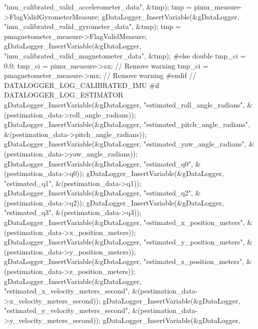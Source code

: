 \begin{DoxyCode}
{       "imu\_calibrated\_valid\_accelerometer\_data", &tmp);}
\textcolor{comment}{    tmp = pimu\_measure->FlagValidGyrometerMeasure;}
\textcolor{comment}{    gDataLogger\_InsertVariable(&gDataLogger,
       "imu\_calibrated\_valid\_gyrometer\_data", &tmp);}
\textcolor{comment}{    tmp = pmagnetometer\_measure->FlagValidMeasure;}
\textcolor{comment}{    gDataLogger\_InsertVariable(&gDataLogger,
       "imu\_calibrated\_valid\_magnetometer\_data", &tmp);}
\textcolor{comment}{    #else}
\textcolor{comment}{    double tmp\_ci = 0.0;}
\textcolor{comment}{    tmp\_ci = pimu\_measure->ax; // Remove warning}
\textcolor{comment}{    tmp\_ci = pmagnetometer\_measure->mx; // Remove warning}
\textcolor{comment}{    #endif // DATALOGGER\_LOG\_CALIBRATED\_IMU}
\textcolor{comment}{}
\textcolor{comment}{ }
\textcolor{comment}{    #if DATALOGGER\_LOG\_ESTIMATOR}
\textcolor{comment}{    gDataLogger\_InsertVariable(&gDataLogger, "estimated\_roll\_angle\_radians",
       &(pestimation\_data->roll\_angle\_radians));}
\textcolor{comment}{    gDataLogger\_InsertVariable(&gDataLogger, "estimated\_pitch\_angle\_radians",
       &(pestimation\_data->pitch\_angle\_radians));}
\textcolor{comment}{    gDataLogger\_InsertVariable(&gDataLogger, "estimated\_yaw\_angle\_radians",
       &(pestimation\_data->yaw\_angle\_radians));}
\textcolor{comment}{    gDataLogger\_InsertVariable(&gDataLogger, "estimated\_q0",
       &(pestimation\_data->q0));}
\textcolor{comment}{    gDataLogger\_InsertVariable(&gDataLogger, "estimated\_q1",
       &(pestimation\_data->q1));}
\textcolor{comment}{    gDataLogger\_InsertVariable(&gDataLogger, "estimated\_q2",
       &(pestimation\_data->q2));}
\textcolor{comment}{    gDataLogger\_InsertVariable(&gDataLogger, "estimated\_q3",
       &(pestimation\_data->q3));}
\textcolor{comment}{    gDataLogger\_InsertVariable(&gDataLogger, "estimated\_x\_position\_meters",
       &(pestimation\_data->x\_position\_meters));}
\textcolor{comment}{    gDataLogger\_InsertVariable(&gDataLogger, "estimated\_y\_position\_meters",
       &(pestimation\_data->y\_position\_meters));}
\textcolor{comment}{    gDataLogger\_InsertVariable(&gDataLogger, "estimated\_z\_position\_meters",
       &(pestimation\_data->z\_position\_meters));}
\textcolor{comment}{    gDataLogger\_InsertVariable(&gDataLogger,
       "estimated\_x\_velocity\_meters\_second", &(pestimation\_data->x\_velocity\_meters\_second));}
\textcolor{comment}{    gDataLogger\_InsertVariable(&gDataLogger,
       "estimated\_y\_velocity\_meters\_second", &(pestimation\_data->y\_velocity\_meters\_second));}
\textcolor{comment}{    gDataLogger\_InsertVariable(&gDataLogger,
}
\end{DoxyCode}
